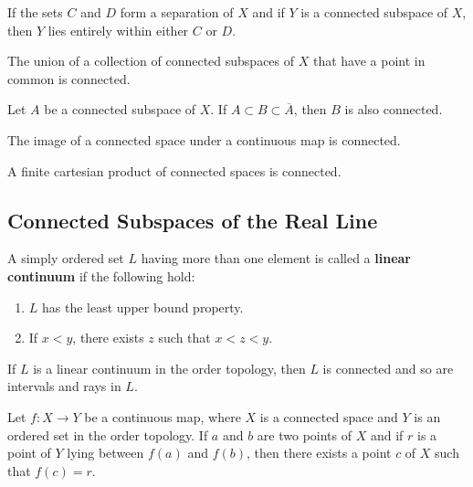 \begin{lemma}
If the sets $C$ and $D$ form a separation of $X$ and if $Y$ is a connected subspace of $X$, then $Y$ lies entirely
within either $C$ or $D$.
\end{lemma}

\begin{theorem}
The union of a collection of connected subspaces of $X$ that have a point in common is connected.
\end{theorem}

\begin{theorem}
Let $A$ be a connected subspace of $X$. If $A \subset B \subset \overline{A}$, then $B$ is also connected.
\end{theorem}

\begin{theorem}
The image of a connected space under a continuous map is connected.
\end{theorem}

\begin{theorem}
A finite cartesian product of connected spaces is connected.    
\end{theorem}

\subsection{Connected Subspaces of the Real Line}

\begin{definition}
A simply ordered set $L$ having more than one element is called a
\textbf{linear continuum} if the following hold:
\begin{enumerate}
    \item $L$ has the least upper bound property.
    \item If $x < y$, there exists $z$ such that $x < z < y$.
\end{enumerate}
\end{definition}

\begin{theorem}
If $L$ is a linear continuum in the order topology, then $L$
is connected and so are intervals and rays in $L$.
\end{theorem}

\begin{theorem}
Let $f\colon X \rightarrow Y$ be a continuous map, where $X$ is a connected space and $Y$ is an ordered set in the order topology.
If $a$ and $b$ are two points of $X$ and if $r$ is a point of $Y$ lying between
$f(a)$ and $f(b)$, then there exists a point $c$ of $X$ such that $f(c) = r$.
\end{theorem}

